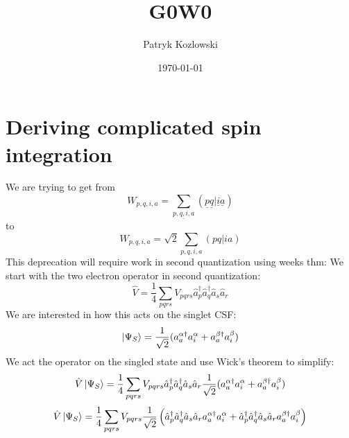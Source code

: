\documentclass[12pt]{article}
\author{Patryk Kozlowski}
\title{G0W0}
\date{\today}
\begin{document}
\maketitle
\section{Deriving complicated spin integration}
We are trying to get from
\begin{equation}
    W_{p,q,i,a} = \sum_{\underline{p,q,i,a}} (\underline{p} \underline{q} | \underline{i} \underline{a} )
\end{equation}
to
\begin{equation}
    W_{p,q,i,a} = \sqrt{2} \sum_{p,q,i,a} (pq|ia)
\end{equation}
This deprecation will require work in second quantization using weeks thm:
We start with the two electron operator in second quantization:
\begin{equation}
    \hat{V} = \frac{1}{4} \sum_{pqrs} V_{pqrs} \hat{a}_{p}^{\dagger} \hat{a}_{q}^{\dagger} \hat{a}_{s} \hat{a}_{r}
\end{equation}
We are interested in how this acts on the singlet CSF:
\begin{equation}
    \ket{\Psi _{S}} = \frac{1}{\sqrt{2}} (a_{a}^{\alpha \dagger } a_{i}^{\alpha } + a_{a}^{\beta \dagger } a_{i}^{\beta })
\end{equation}
We act the operator on the singled state and use Wick's theorem to simplify:
\begin{equation}
    \hat{V} \ket{\Psi _{S}} = \frac{1}{4} \sum_{pqrs} V_{pqrs} \hat{a}_{p}^{\dagger} \hat{a}_{q}^{\dagger} \hat{a}_{s} \hat{a}_{r} \frac{1}{\sqrt{2}} (a_{a}^{\alpha \dagger } a_{i}^{\alpha } + a_{a}^{\beta \dagger } a_{i}^{\beta })
\end{equation}
\begin{equation}
    \hat{V} \ket{\Psi _{S}} = \frac{1}{4} \sum_{pqrs} V_{pqrs} \frac{1}{\sqrt{2}} \left(\hat{a}_{p}^{\dagger} \hat{a}_{q}^{\dagger} \hat{a}_{s} \hat{a}_{r} a_{a}^{\alpha \dagger } a_{i}^{\alpha } + \hat{a}_{p}^{\dagger} \hat{a}_{q}^{\dagger} \hat{a}_{s} \hat{a}_{r} a_{a}^{\beta \dagger } a_{i}^{\beta }\right)
\end{equation}
\end{document}
